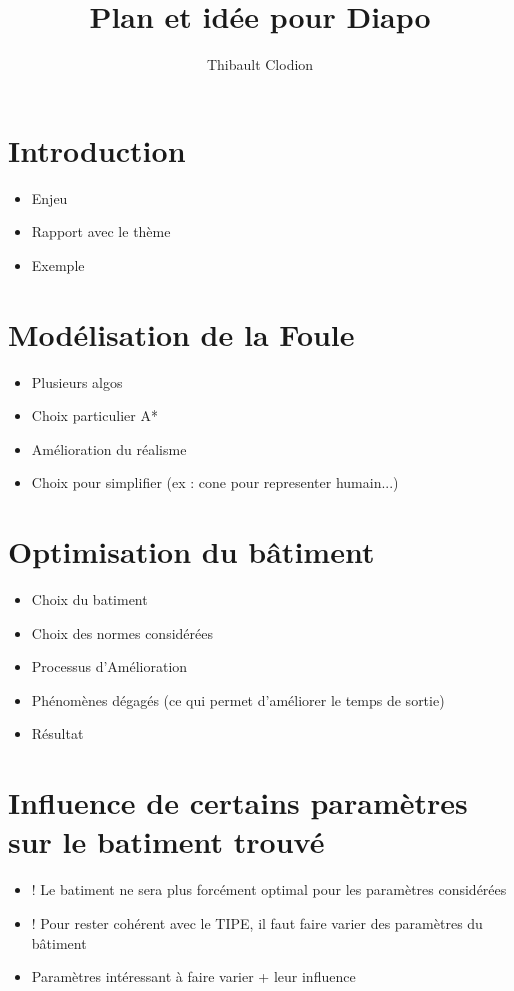 \documentclass[12pt]{article}
\title{Plan et idée pour Diapo}
\author{Thibault Clodion}
\begin{document}
\maketitle %

\section{Introduction}

\begin{itemize}
    \item Enjeu
    \item Rapport avec le thème
    \item Exemple
\end{itemize}

\section{Modélisation de la Foule}

\begin{itemize}
    \item Plusieurs algos
    \item Choix particulier A*
    \item Amélioration du réalisme
    \item Choix pour simplifier (ex : cone pour representer humain...)
\end{itemize}

\section{Optimisation du bâtiment}

\begin{itemize}
    \item Choix du batiment
    \item Choix des normes considérées 
    \item Processus d'Amélioration
    \item Phénomènes dégagés (ce qui permet d'améliorer le temps de sortie)
    \item Résultat
\end{itemize}

\section{Influence de certains paramètres sur le batiment trouvé}

\begin{itemize}
    \item ! Le batiment ne sera plus forcément optimal pour les paramètres considérées
    \item ! Pour rester cohérent avec le TIPE, il faut faire varier des paramètres du bâtiment
    \item Paramètres intéressant à faire varier + leur influence
\end{itemize}
\end{document}
